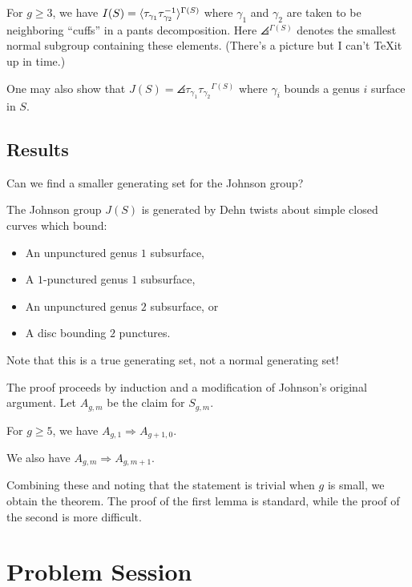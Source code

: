 \documentclass{amsart}
\begin{document}
For $g \geq 3$, we have $I(S) = \langle\tau_{\gamma_1} \tau_{\gamma_2}^{-1}\rangle^{\Gamma(S)}$ where $\gamma_1$ and $\gamma_2$ are taken to be neighboring ``cuffs'' in a pants decomposition.
Here $\angles{}^{\Gamma(S)}$ denotes the smallest normal subgroup containing these elements.
(There's a picture but I can't \TeX it up in time.)

One may also show that $J(S) = \angles{\tau_{\gamma_1} \tau_{\gamma_2}}^{\Gamma(S)}$ where $\gamma_i$ bounds a genus $i$ surface in $S$.

\subsection{Results}

Can we find a smaller generating set for the Johnson group?

\begin{thm}
  The Johnson group $J(S)$ is generated by Dehn twists about simple closed curves which bound:
  \begin{itemize}
    \item An unpunctured genus $1$ subsurface,
    \item A $1$-punctured genus $1$ subsurface,
    \item An unpunctured genus $2$ subsurface, or
    \item A disc bounding $2$ punctures.
  \end{itemize}
\end{thm}

Note that this is a true generating set, not a normal generating set!

The proof proceeds by induction and a modification of Johnson's original argument.
Let $A_{g,m}$ be the claim for $S_{g,m}$.

\begin{lem}
  For $g \geq 5$, we have $A_{g,1} \Rightarrow A_{g+1,0}$.
\end{lem}

\begin{lem}
  We also have $A_{g,m} \Rightarrow A_{g,m+1}$.
\end{lem}

Combining these and noting that the statement is trivial when $g$ is small, we obtain the theorem.
The proof of the first lemma is standard, while the proof of the second is more difficult.

\section{Problem Session}
\end{document}
